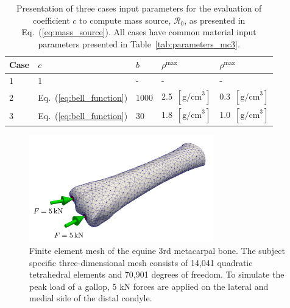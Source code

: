 \documentclass[11pt]{acmeArticle}
\numberwithin{equation}{section}
\begin{document}
\begin{table}[h]
	\centering
	\begin{tabular}{lllll}
		\hline
		Case                  & $c$              				       & $b$     &$\rho^\mathrm{max}$               &$\rho^\mathrm{max}$ \\ \hline
		1                     & 1              								 & -       & -                                & -\\
		2                     & Eq.~(\ref{eq:bell_function})   & 1000    & 2.5~$[{\text{g/cm}}^3]$          & 0.3~$[{\text{g/cm}}^3]$\\
		3                     & Eq.~(\ref{eq:bell_function})   & 30      & 1.8~$[{\text{g/cm}}^3]$          &1.0~$[{\text{g/cm}}^3]$ \\
		\hline
	\end{tabular} 
	\caption{Presentation of three cases input parameters for the evaluation of coefficient $c$ to compute mass source, $\mathcal{R}_0$, as presented in Eq.~(\ref{eq:mass_source}). All cases have common material input parameters presented in Table~\ref{tab:parameters_mc3}.}
	\label{tab:three_cases}
\end{table}


\begin{figure}[h!]
	\begin{centering}
		\includegraphics[width=8cm]{Figures/mc3_BC.png}
		\caption{Finite element mesh of the equine 3rd metacarpal bone. The subject specific three-dimensional mesh consists of 14,041 quadratic tetrahedral elements and 70,901 degrees of freedom. To simulate the peak load of a gallop, 5 kN forces are applied on the lateral and medial side of the distal condyle.}
		\label{fig:mc3_BC}
	\end{centering}
\end{figure}
\end{document}
